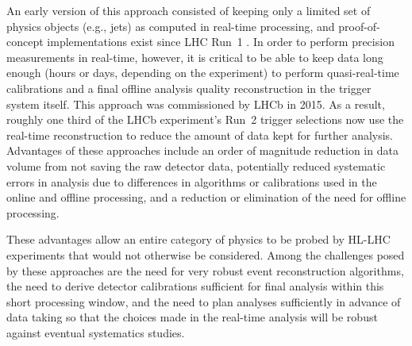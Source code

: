 An early version of this approach consisted of keeping only a limited set of physics objects (e.g., jets) as computed in real-time processing, and proof-of-concept implementations exist since LHC 
Run~1 \cite{Aaij2016,Abreu2014,CMS2016}. In order to perform precision measurements in real-time, however, it is critical to be able to keep data long enough (hours or days, depending on the experiment) 
to perform quasi-real-time calibrations and a final offline analysis quality reconstruction in the trigger system itself. This approach was commissioned by LHCb in 2015. As a result, roughly one 
third of the LHCb experiment’s Run~2 trigger selections now use the real-time reconstruction to reduce the amount of data kept for further analysis. Advantages of these approaches include an order 
of magnitude reduction in data volume from not saving the raw detector data, potentially reduced systematic errors in analysis due to differences in algorithms or calibrations used in the online 
and offline processing, and a reduction or elimination of the need for offline processing. 


These advantages allow an entire category of physics to be probed by HL-LHC experiments that would not otherwise be considered. Among the challenges posed by these approaches are the need for 
very robust event reconstruction algorithms, the need to derive detector calibrations sufficient for final analysis within this short processing window, and the need to plan analyses sufficiently 
in advance of data taking so that the choices made in the real-time analysis will be robust against eventual systematics studies.

